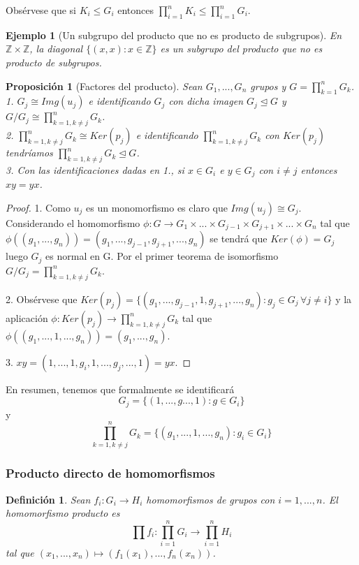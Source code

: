 \documentclass{article}
\theoremstyle{theorem-style}  %
\newtheorem{proposition}[theorem]{Proposición}
\theoremstyle{definition-style}
\newtheorem{definition}{Definición}[section]
\theoremstyle{example-style}
\newtheorem{example}{Ejemplo}[section]
\begin{document}
Obsérvese que si $K_i \le G_i$ entonces $\prod_{i=1}^{n} K_i \le \prod_{i=1}^{n} G_i$.

\begin{example}[Un subgrupo del producto que no es producto de subgrupos]
En $\mathbb{Z} \times \mathbb{Z}$, la diagonal $\{(x,x):x \in \mathbb{Z}\}$ es un subgrupo del producto que no es producto de subgrupos.
\end{example}

\begin{proposition}[Factores del producto]
Sean $G_1,...,G_n$ grupos y $G = \prod_{k=1}^{n} G_k$. \\
1. $G_j \cong Img(u_j)$ e identificando $G_j$ con dicha imagen $G_j \trianglelefteq G$ y $G/G_j \cong \prod_{k=1,k \neq j}^{n} G_k$. \\
2. $\prod_{k=1,k \neq j}^{n} G_k \cong Ker(p_j)$ e identificando $\prod_{k=1,k \neq j}^{n} G_k$ con $Ker(p_j)$ tendríamos $\prod_{k=1,k \neq j}^{n} G_k \trianglelefteq G$.\\ 
3. Con las identificaciones dadas en 1., si $x \in G_i$ e $y \in G_j$ con $i \neq j$ entonces $xy = yx$.
\end{proposition}
\begin{proof}
1. Como $u_j$ es un monomorfismo es claro que $Img(u_j) \cong G_j$. Considerando el homomorfismo $\phi:G \rightarrow G_1 \times ... \times G_{j-1} \times G_{j+1} \times ... \times G_n$ tal que $\phi((g_1,...,g_n)) = (g_1,...,g_{j-1},g_{j+1},...,g_n)$ se tendrá que $Ker(\phi) = G_j$ luego $G_j$ es normal en G. Por el primer teorema de isomorfismo $G/G_j = \prod_{k=1,k \neq j}^{n} G_k$.

2. Obsérvese que $Ker(p_j) = \{(g_1,...,g_{j-1},1,g_{j+1},...,g_n):g_j \in G_j \, \forall j \neq i\}$ y la aplicación $\phi:Ker(p_j) \rightarrow \prod_{k=1,k \neq j}^{n} G_k$ tal que $\phi((g_1,...,1,...,g_n)) = (g_1,...,g_n)$.

3. $xy = (1,...,1,g_i,1,...,g_j,...,1) = yx$.
\end{proof}

En resumen, tenemos que formalmente se identificará $$G_j = \{(1,...,g...,1):g \in G_i\}$$ y $$\prod_{k=1,k \neq j}^{n} G_k = \{(g_1,...,1,...,g_n):g_i \in G_i\}$$

\subsubsection{Producto directo de homomorfismos}

\begin{definition}
Sean $f_i:G_i \rightarrow H_i$ homomorfismos de grupos con $i=1,...,n$. El homomorfismo producto es $$\prod f_i:\prod_{i=1}^{n} G_i \rightarrow \prod_{i=1}^{n} H_i$$ tal que $(x_1,...,x_n) \mapsto (f_1(x_1),...,f_n(x_n))$.
\end{definition}
\end{document}
